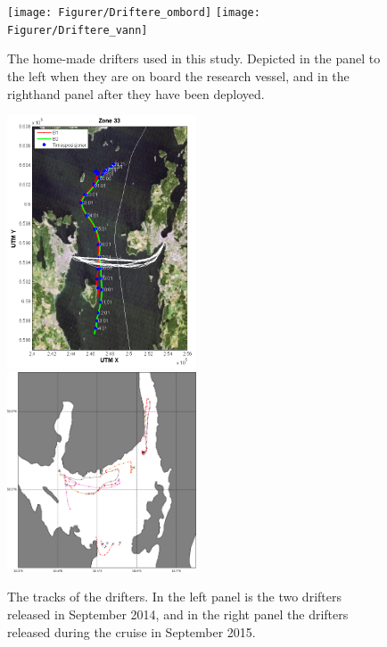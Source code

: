 \begin{figure}[ht]
\centerline{
\texttt{[image: Figurer/Driftere\_ombord]}
\texttt{[image: Figurer/Driftere\_vann]}
}
\caption{\small
The home-made drifters used in this study. Depicted in the panel to the left when they are on board the research vessel, and in the righthand panel after they have been deployed.}
\label{fig:drifters_design}
\end{figure}

\begin{figure}[ht]
\centerline{
\includegraphics*[width=0.5\textwidth]{Figurer/drifters_sept2014}
\includegraphics*[width=0.5\textwidth]{Figurer/drifters_low_crop}
}
\caption{\small
The tracks of the drifters. In the left panel is the two drifters released in September 2014, and in the right panel the drifters released during the cruise in September 2015.}
\label{fig:drifters_tracks}
\end{figure}

\newpage
\clearpage